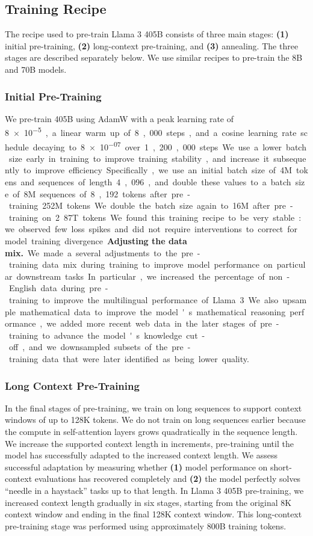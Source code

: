 \subsection{Training Recipe}
\label{section:pretraining_training_recipe}
The recipe used to pre-train Llama 3 405B consists of three main stages: \textbf{(1)} initial pre-training, \textbf{(2)} long-context pre-training, and \textbf{(3)} annealing. 
The three stages are described separately below.
We use similar recipes to pre-train the 8B and 70B models.

\subsubsection{Initial Pre-Training}
We pre-train \llamathree 405B using AdamW with a peak learning rate of \SI{8e-5}, a linear warm up of 8,000 steps, and a cosine learning rate schedule decaying to \SI{8e-07} over 1,200,000 steps.
We use a lower batch size early in training to improve training stability, and increase it subsequently to improve efficiency. 
Specifically, we use an initial batch size of 4M tokens and sequences of length 4,096, and double these values to a batch size of 8M sequences of 8,192 tokens after pre-training 252M tokens.
We double the batch size again to 16M after pre-training on 2.87T tokens.
We found this training recipe to be very stable: we observed few loss spikes and did not require interventions to correct for model training divergence.

\textbf{Adjusting the data mix.} 
We made a several adjustments to the pre-training data mix during training to improve model performance on particular downstream tasks. 
In particular, we increased the percentage of non-English data during pre-training to improve the multilingual performance of Llama 3.
We also upsample mathematical data to improve the model's mathematical reasoning performance, we added more recent web data in the later stages of pre-training to advance the model's knowledge cut-off, and we downsampled subsets of the pre-training data that were later identified as being lower quality.


\subsubsection{Long Context Pre-Training}
In the final stages of pre-training, we train on long sequences to support context windows of up to 128K tokens. 
We do not train on long sequences earlier because the compute in self-attention layers grows quadratically in the sequence length.
We increase the supported context length in increments, pre-training until the model has successfully adapted to the increased context length. 
We assess successful adaptation by measuring whether \textbf{(1)} model performance on short-context evaluations has recovered completely and \textbf{(2)} the model perfectly solves ``needle in a haystack'' tasks up to that length. 
In Llama 3 405B pre-training, we increased context length gradually in six stages, starting from the original 8K context window and ending in the final 128K context window.
This long-context pre-training stage was performed using approximately 800B training tokens.

